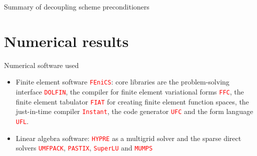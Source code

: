 \documentclass[handout]{beamer}
\newcommand{\re}[1]{{\textcolor{red}       {#1}}}
\renewcommand{\div}{\nabla\cdot\,}
\renewcommand{\div}{\nabla\cdot\,}
\begin{document}
\begin{frame}{Summary of decoupling scheme preconditioners}
\begin{table}[h!]
\begin{center}
  \caption{Summary of coefficient matrices and corresponding preconditioners for each the decoupling scheme}
  \label{tab:SummaryTable}
  \end{center}
  \end{table}
\end{frame}

\section{Numerical results}

\begin{frame}{Numerical software used}

\begin{itemize}
  \item Finite element software \re{\tt FEniCS}: core libraries are the problem-solving interface \re{\tt DOLFIN},  the compiler for finite element variational forms \re{\tt FFC}, the finite element  tabulator \re{\tt FIAT} for creating finite element function spaces, the just-in-time compiler \re{\tt Instant},  the code generator \re{\tt UFC} and  the form language \re{\tt UFL}.
  \item Linear algebra software: \re{\tt HYPRE} as a multigrid solver and the sparse direct solvers  \re{\tt UMFPACK}, \re{\tt PASTIX}, \re{\tt SuperLU} and \re{\tt MUMPS}
\end{itemize}
\end{frame}



\end{document}
